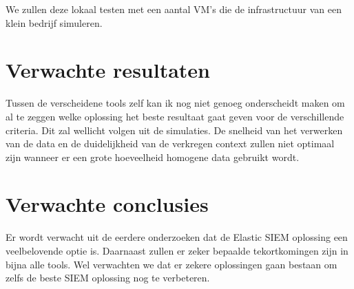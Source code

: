 We zullen deze lokaal testen met een aantal VM's die de infrastructuur van een klein bedrijf simuleren.

\section{Verwachte resultaten}
\label{sec:verwachte_resultaten}

Tussen de verscheidene tools zelf kan ik nog niet genoeg onderscheidt maken om al te zeggen welke oplossing het beste resultaat gaat geven voor de verschillende criteria. Dit zal wellicht volgen uit de simulaties. De snelheid van het verwerken van de data en de duidelijkheid van de verkregen context zullen niet optimaal zijn wanneer er een grote hoeveelheid homogene data gebruikt wordt.

\section{Verwachte conclusies}
\label{sec:verwachte_conclusies}

Er wordt verwacht uit de eerdere onderzoeken dat de Elastic SIEM oplossing een veelbelovende optie is. Daarnaast zullen er zeker bepaalde tekortkomingen zijn in bijna alle tools. Wel verwachten we dat er zekere oplossingen gaan bestaan om zelfs de beste SIEM oplossing nog te verbeteren.

